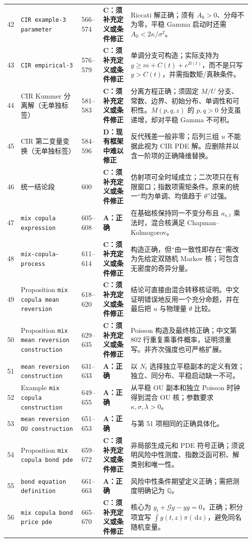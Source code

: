 \documentclass[UTF8,11pt]{ctexart}
\newcommand{\dd}{\,\mathrm d}
\newcommand{\Acat}{\textcolor{green!45!black}{\textbf{A：正确}}}
\newcommand{\Ccat}{\textcolor{orange!80!black}{\textbf{C：须补充定义或条件修正}}}
\newcommand{\Dcat}{\textcolor{red!70!black}{\textbf{D：现有框架中难以修正}}}
\begin{document}
\begin{longtable}{p{}p{}p{}p{}p{}}
42 & \texttt{CIR example-3 parameter} & 566--574 & \Ccat & Riccati 解正确；须有 $A_0>0$、分母不为零，平稳 Gamma 启动时还需 $A_0<2\kappa/\sigma^2$。\\
43 & \texttt{CIR empirical-3} & 576--579 & \Ccat & 单调分支可构造；实际支持为 $y\ge m+C(t)+e^{B(t)}$，而不是只写 $y>C(t)$，并需指数矩/真鞅条件。\\
44 & CIR Kummer 分离解（无单独标签） & 581--583 & \Ccat & 分离方程正确；须固定 $M/U$ 分支、常数、边界、初始分布、单调性和可积性。$M(p,q,z)$ 的 $p,q>0$ 分支虽递增，却对平稳 Gamma 不可积。\\
45 & CIR 第二变量变换（无单独标签） & 584--596 & \Dcat & 反代残差一般非零；后列三组 $u$ 不能据此视为 CIR PDE 解。应删除并以含一阶项的正确降维替换。\\
46 & 统一结论段 & 600 & \Ccat & 仿射项可全时域成立；二次项只在有限窗口；指数项需矩条件。原来的统一“均为单调、均值趋于 $\theta$”过强。\\
47 & \texttt{mix copula expression} & 605--608 & \Acat & 在基础核保持同一不变分布且 $a_{s,t}$ 乘法时，混合核满足 Chapman--Kolmogorov。\\
48 & \texttt{mix-copula-process} & 611--614 & \Ccat & 构造正确，但“由一致性即存在”需改为先给定双随机 Markov 核；可包含无密度的奇异分量。\\
49 & Proposition \texttt{mix copula mean reversion} & 618--620 & \Ccat & 结论可直接由混合转移核证明。中文证明错误地反用一个充分命题，并在最后把 $u$ 与物理量 $\theta$ 比较。\\
50 & Proposition \texttt{mix mean reversion construction} & 629--635 & \Ccat & Poisson 构造及最终核正确；中文第 802 行重复乘事件概率，证明须重写。非齐次强度也可严格扩展。\\
51 & \texttt{mean reversion construction} & 631--633 & \Acat & 以 $N_t$ 选择独立平稳副本的定义有效；独立、同分布、平稳启动缺一不可。\\
52 & Example \texttt{mix copula construction} & 649--655 & \Acat & 从平稳 OU 副本和独立 Poisson 时钟得到混合 OU 核；参数要求 $\kappa,\sigma,\lambda>0$。\\
53 & \texttt{mean reversion OU construction} & 651--653 & \Acat & 与第 51 项相同的正确具体化。\\
54 & Proposition \texttt{mix copula bond pde} & 659--672 & \Ccat & 非局部生成元和 PDE 符号正确；须说明风险中性测度、指数泛函可积、解类别和唯一性。\\
55 & \texttt{bond equation definition} & 661--663 & \Acat & 风险中性条件期望定义正确；需把测度明确记为 $\mathbb Q$。\\
56 & \texttt{mix copula bond price pde} & 665--670 & \Ccat & 核心为 $g_t+\mathcal Gg-yg=0$，正确；积分项宜写 $\int g(t,z)\pi(\dd z)$，避免同名随机变量。\\
\bottomrule
\end{longtable}
\normalsize
\end{document}
